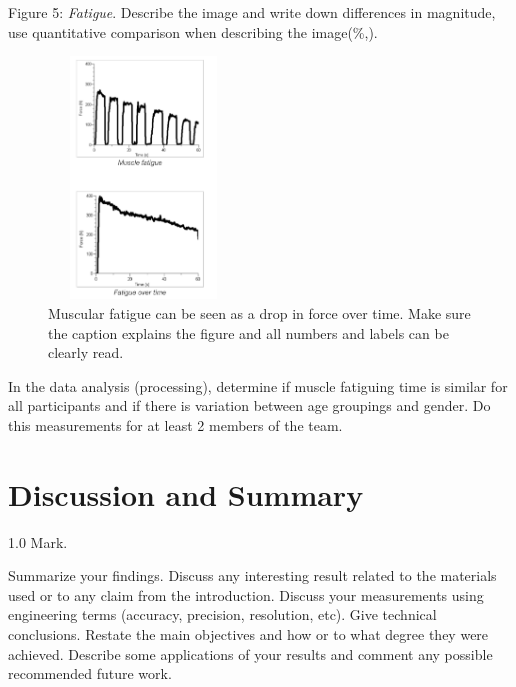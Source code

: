 \documentclass[journal]{IEEEtran}
\begin{document}
Figure 5: {\it Fatigue}.
Describe the image and write down differences in magnitude, use quantitative comparison when describing the image(\%,). \\

\begin{figure}[H]
\begin {center}
\includegraphics[width=0.45\textwidth,height=2.5333in]{images/fatigue_dynam.png}
\caption{Muscular fatigue can be seen as a drop in force over time. Make sure the caption explains the figure and all numbers and labels can be clearly read.}
\label{fig:fatigue}
\end {center}
\end{figure}

In the data analysis (processing), determine if muscle fatiguing time is similar for all participants and if there is variation between age groupings and gender.  Do this measurements for at least 2 members of the team.\\
    





\section{Discussion and Summary}
\begin{flushright} 1.0 Mark. \end{flushright}

Summarize your findings. Discuss any interesting result related to the materials used or to any claim from the introduction. Discuss your measurements using engineering terms (accuracy, precision, resolution, etc).  Give technical conclusions. Restate the main objectives and how or to what degree they were achieved. Describe some applications of your results and comment any possible recommended future work.
\end{document}
